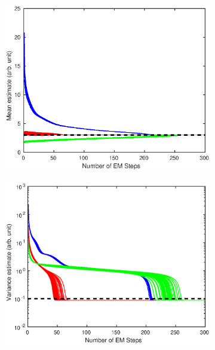 \documentclass[12pt]{report}
\begin{document}
\begin{figure}
	\begin{subfigure}{0.5\textwidth}
		\includegraphics[width=\textwidth]{figures/hierarchicalModel/EM_initial_mean.eps}
	\end{subfigure}
	\begin{subfigure}{0.5\textwidth}
		\includegraphics[width=\textwidth]{figures/hierarchicalModel/EM_initial_var.eps}
	\end{subfigure}
	\begin{subfigure}{0.5\textwidth}

\end{subfigure}
\end{figure}
\end{document}
